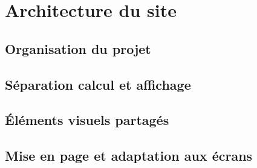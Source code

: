 
\chapter{Architecture du site}\label{chap:architecture}

\section{Organisation du projet}

\section{Séparation calcul et affichage}

\section{Éléments visuels partagés}

\section{Mise en page et adaptation aux écrans}
